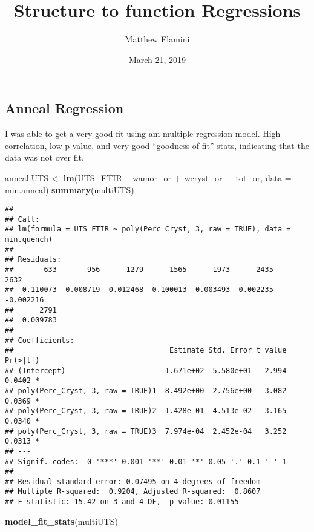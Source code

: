 \documentclass[]{article}
\title{Structure to function Regressions}
\author{Matthew Flamini}
\date{March 21, 2019}
\newenvironment{Shaded}{\begin{snugshade}}{\end{snugshade}}
\newcommand{\DataTypeTok}[1]{\textcolor[rgb]{0.13,0.29,0.53}{#1}}
\newcommand{\KeywordTok}[1]{\textcolor[rgb]{0.13,0.29,0.53}{\textbf{#1}}}
\newcommand{\NormalTok}[1]{#1}
\newcommand{\OperatorTok}[1]{\textcolor[rgb]{0.81,0.36,0.00}{\textbf{#1}}}
\newcommand{\StringTok}[1]{\textcolor[rgb]{0.31,0.60,0.02}{#1}}
\begin{document}
\maketitle

\hypertarget{anneal-regression}{%
\subsection{Anneal Regression}\label{anneal-regression}}

I was able to get a very good fit using am multiple regression model.
High correlation, low p value, and very good ``goodness of fit'' stats,
indicating that the data was not over fit.

\begin{Shaded}
\begin{Highlighting}[]
\NormalTok{anneal.UTS <-}\StringTok{ }\KeywordTok{lm}\NormalTok{(UTS_FTIR }\OperatorTok{~}\StringTok{ }\NormalTok{wamor_or }\OperatorTok{+}\StringTok{ }\NormalTok{wcryst_or }\OperatorTok{+}\StringTok{ }\NormalTok{tot_or, }\DataTypeTok{data =}\NormalTok{ min.anneal)}
\KeywordTok{summary}\NormalTok{(multiUTS)}
\end{Highlighting}
\end{Shaded}

\begin{verbatim}
## 
## Call:
## lm(formula = UTS_FTIR ~ poly(Perc_Cryst, 3, raw = TRUE), data = min.quench)
## 
## Residuals:
##       633       956      1279      1565      1973      2435      2632 
## -0.110073 -0.008719  0.012468  0.100013 -0.003493  0.002235 -0.002216 
##      2791 
##  0.009783 
## 
## Coefficients:
##                                    Estimate Std. Error t value Pr(>|t|)  
## (Intercept)                      -1.671e+02  5.580e+01  -2.994   0.0402 *
## poly(Perc_Cryst, 3, raw = TRUE)1  8.492e+00  2.756e+00   3.082   0.0369 *
## poly(Perc_Cryst, 3, raw = TRUE)2 -1.428e-01  4.513e-02  -3.165   0.0340 *
## poly(Perc_Cryst, 3, raw = TRUE)3  7.974e-04  2.452e-04   3.252   0.0313 *
## ---
## Signif. codes:  0 '***' 0.001 '**' 0.01 '*' 0.05 '.' 0.1 ' ' 1
## 
## Residual standard error: 0.07495 on 4 degrees of freedom
## Multiple R-squared:  0.9204, Adjusted R-squared:  0.8607 
## F-statistic: 15.42 on 3 and 4 DF,  p-value: 0.01155
\end{verbatim}

\begin{Shaded}
\begin{Highlighting}[]
\KeywordTok{model_fit_stats}\NormalTok{(multiUTS)}
\end{Highlighting}
\end{Shaded}
\end{document}
